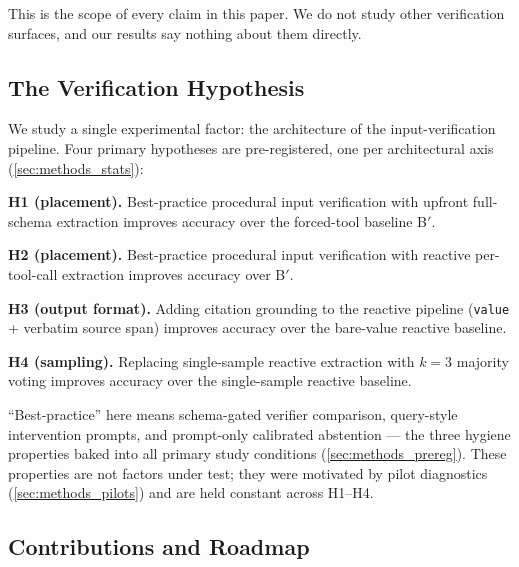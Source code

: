 This is the scope of every claim in this paper. We do not study other
verification surfaces, and our results say nothing about them directly.

\subsection{The Verification Hypothesis}
\label{sec:intro_hypothesis}

We study a single experimental factor: the architecture of the
input-verification pipeline. Four primary hypotheses are
pre-registered, one per architectural axis (\cref{sec:methods_stats}):

\textbf{H1 (placement).} Best-practice procedural input verification
with upfront full-schema extraction improves accuracy over the
forced-tool baseline B$'$.

\textbf{H2 (placement).} Best-practice procedural input verification
with reactive per-tool-call extraction improves accuracy over B$'$.

\textbf{H3 (output format).} Adding citation grounding to the
reactive pipeline (\texttt{value} + verbatim source span) improves
accuracy over the bare-value reactive baseline.

\textbf{H4 (sampling).} Replacing single-sample reactive extraction
with $k=3$ majority voting improves accuracy over the single-sample
reactive baseline.

``Best-practice'' here means schema-gated verifier comparison,
query-style intervention prompts, and prompt-only calibrated
abstention --- the three hygiene properties baked into all primary
study conditions (\cref{sec:methods_prereg}). These properties are
not factors under test; they were motivated by pilot diagnostics
(\cref{sec:methods_pilots}) and are held constant across H1--H4.

\subsection{Contributions and Roadmap}
\label{sec:intro_contributions}

